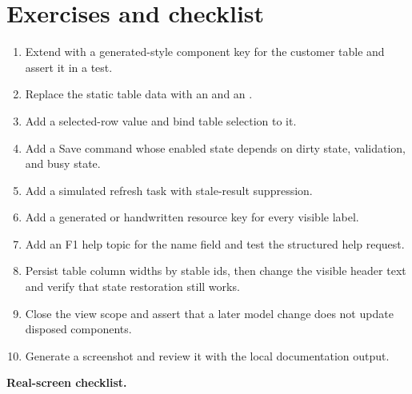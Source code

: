 \section{Exercises and checklist}

\begin{exercisebox}
\begin{enumerate}
\item Extend \bookAppExample{} with a generated-style component key for the
customer table and assert it in a test.
\item Replace the static table data with an  and an
.
\item Add a selected-row value and bind table selection to it.
\item Add a Save command whose enabled state depends on dirty state,
validation, and busy state.
\item Add a simulated refresh task with stale-result suppression.
\item Add a generated or handwritten resource key for every visible label.
\item Add an F1 help topic for the name field and test the structured help
request.
\item Persist table column widths by stable ids, then change the visible
header text and verify that state restoration still works.
\item Close the view scope and assert that a later model change does not update
disposed components.
\item Generate a screenshot and review it with the local documentation output.
\end{enumerate}
\end{exercisebox}

\begin{center}
\textbf{Real-screen checklist.}
\end{center}


